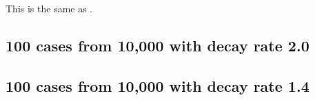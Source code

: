This is the same as .

\begin{table}[H]
\centering
\scriptsize

    \begin{subtable}{0.5\textwidth}
    
    \caption{Means} 
    \end{subtable}%
    \begin{subtable}{0.5\textwidth}
    
    \caption{Standard deviations} 
    \end{subtable}

\caption{Error rates for uniform population of 10,000, single peak intensity of factor 100 and no decay (uniform)}
\label{tbl:mean_error_rates:unif_100_unif:2}
\end{table}

\subsection{100 cases from 10,000 with decay rate 2.0}
\begin{table}[H]
\centering
\scriptsize

    \begin{subtable}{0.5\textwidth}
    
    \caption{Means} 
    \end{subtable}%
    \begin{subtable}{0.5\textwidth}
    
    \caption{Standard deviations} 
    \end{subtable}

\caption{Error rates for uniform population of 10,000, single peak intensity of factor 100 and decay rate 2.0}
\label{tbl:mean_error_rates:unif_100_2_1h}
\end{table}

\subsection{100 cases from 10,000 with decay rate 1.4}
\begin{table}[H]
\centering
\scriptsize

    \begin{subtable}{0.5\textwidth}
    
    \caption{Means} 
    \end{subtable}%
    \begin{subtable}{0.5\textwidth}
    
    \caption{Standard deviations} 
    \end{subtable}

\caption{Error rates for uniform population of 10,000, single peak intensity of factor 100 and decay rate 1.4}
\label{tbl:mean_error_rates:unif_100_1.4_1h}
\end{table}

